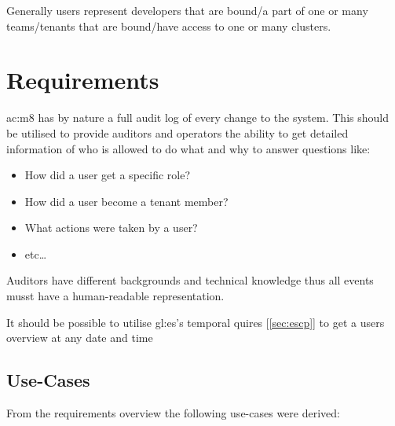 Generally users represent developers that are bound/a part of one or many teams/tenants that are bound/have access to one or many clusters.

\section{Requirements}

\Gls{ac:m8} has by nature a full audit log of every change to the system. This should be utilised to provide auditors and operators the ability to get detailed information of who is allowed to do what and why to answer questions like:

\begin{itemize}
  \item How did a user get a specific role?
  \item How did a user become a tenant member?
  \item What actions were taken by a user?
  \item etc\dots
\end{itemize}

Auditors have different backgrounds and technical knowledge thus all events musst have a human-readable representation.

It should be possible to utilise \gls{gl:es}'s temporal quires [\ref{sec:escp}] to get a users overview at any date and time 

\subsection{Use-Cases}

From the requirements overview the following use-cases were derived:


